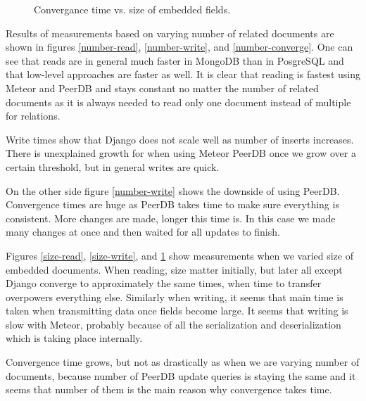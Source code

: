 \begin{figure}%
%
\caption{Convergance time vs. size of embedded fields.}%
\label{size-converge}%
\end{figure}

Results of measurements based on varying number of related documents are shown in figures \ref{number-read}, \ref{number-write}, and \ref{number-converge}.
One can see that reads are in general much faster in MongoDB than in PosgreSQL and that low-level approaches are faster as well.
It is clear that reading is fastest using Meteor and PeerDB and stays constant no matter the number of related documents as it is always needed to read only one document instead of multiple for relations.

Write times show that Django does not scale well as number of inserts increases. There is unexplained growth for when using Meteor PeerDB once we grow over a certain threshold, but in general writes are quick.

On the other side figure \ref{number-write} shows the downside of using PeerDB. Convergence times are huge as PeerDB takes time to make sure everything is consistent.
More changes are made, longer this time is.
In this case we made many changes at once and then waited for all updates to finish.

Figures \ref{size-read}, \ref{size-write}, and \ref{size-converge} show measurements when we varied size of embedded documents. When reading, size matter initially, but later all except Django converge to approximately the same times, when time to transfer overpowers everything else. Similarly when writing, it seems that main time is taken when transmitting data once fields become large. It seems that writing is slow with Meteor, probably because of all the serialization and deserialization which is taking place internally.

Convergence time grows, but not as drastically as when we are varying number of documents, because number of PeerDB update queries is staying the same and it seems that number of them is the main reason why convergence takes time.